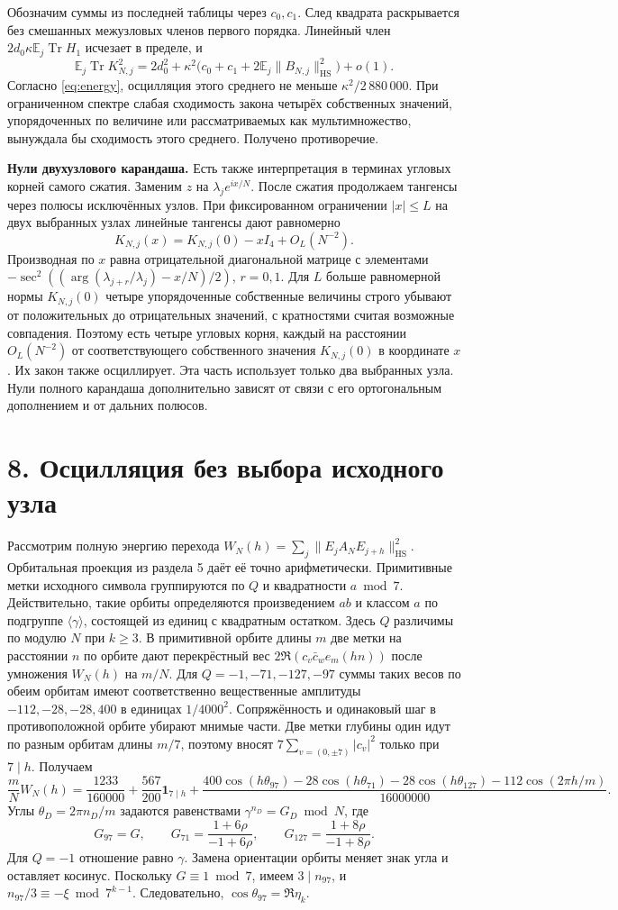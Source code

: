 \documentclass[11pt,a4paper]{article}
\newcommand{\Tr}{\operatorname{Tr}}
\newcommand{\EE}{\mathbb E}
\newcommand{\sect}[1]{\section*{\sffamily\color{ink}#1}}
\newcommand{\subt}[1]{\par\medskip\noindent\textbf{#1.}\quad}
\newcommand{\HS}{\mathrm{HS}}
\begin{document}
Обозначим суммы из последней таблицы через \(c_0,c_1\). След квадрата раскрывается без смешанных межузловых членов первого порядка. Линейный член \(2d_0\kappa\EE_j\Tr H_1\) исчезает в пределе, и
\[
  \EE_j\Tr K_{N,j}^2=
  2d_0^2+\kappa^2\bigl(c_0+c_1+2\EE_j\|B_{N,j}\|_{\HS}^2\bigr)+o(1).
\]
Согласно \eqref{eq:energy}, осцилляция этого среднего не меньше \(\kappa^2/2\,880\,000\). При ограниченном спектре слабая сходимость закона четырёх собственных значений, упорядоченных по величине или рассматриваемых как мультимножество, вынуждала бы сходимость этого среднего. Получено противоречие.

\subt{Нули двухузлового карандаша}
Есть также интерпретация в терминах угловых корней самого сжатия. Заменим \(z\) на \(\lambda_j e^{ix/N}\). После сжатия продолжаем тангенсы через полюсы исключённых узлов. При фиксированном ограничении \(|x|\le L\) на двух выбранных узлах линейные тангенсы дают равномерно
\[
       K_{N,j}(x)=K_{N,j}(0)-xI_4+O_L(N^{-2}).
\]
Производная по \(x\) равна отрицательной диагональной матрице с элементами \(-\sec^2((\arg(\lambda_{j+r}/\lambda_j)-x/N)/2)\), \(r=0,1\). Для \(L\) больше равномерной нормы \(K_{N,j}(0)\) четыре упорядоченные собственные величины строго убывают от положительных до отрицательных значений, с кратностями считая возможные совпадения. Поэтому есть четыре угловых корня, каждый на расстоянии \(O_L(N^{-2})\) от соответствующего собственного значения \(K_{N,j}(0)\) в координате \(x\). Их закон также осциллирует. Эта часть использует только два выбранных узла. Нули полного карандаша дополнительно зависят от связи с его ортогональным дополнением и от дальних полюсов.

\newpage
\sect{8. Осцилляция без выбора исходного узла}
Рассмотрим полную энергию перехода \(W_N(h)=\sum_j\|E_jA_NE_{j+h}\|_{\HS}^2\). Орбитальная проекция из раздела 5 даёт её точно арифметически. Примитивные метки исходного символа группируются по \(Q\) и квадратности \(a\bmod7\). Действительно, такие орбиты определяются произведением \(ab\) и классом \(a\) по подгруппе \(\langle\gamma\rangle\), состоящей из единиц с квадратным остатком. Здесь \(Q\) различимы по модулю \(N\) при \(k\ge3\). В примитивной орбите длины \(m\) две метки на расстоянии \(n\) по орбите дают перекрёстный вес \(2\Re(c_v\bar c_w e_m(hn))\) после умножения \(W_N(h)\) на \(m/N\). Для \(Q=-1,-71,-127,-97\) суммы таких весов по обеим орбитам имеют соответственно вещественные амплитуды \(-112,-28,-28,400\) в единицах \(1/4000^2\). Сопряжённость и одинаковый шаг в противоположной орбите убирают мнимые части. Две метки глубины один идут по разным орбитам длины \(m/7\), поэтому вносят \(7\sum_{v=(0,\pm7)}|c_v|^2\) только при \(7\mid h\). Получаем
\[
 \frac mN W_N(h)=\frac{1233}{160000}+\frac{567}{200}\mathbf1_{7\mid h}
 +\frac{400\cos(h\theta_{97})-28\cos(h\theta_{71})
 -28\cos(h\theta_{127})-112\cos(2\pi h/m)}{16000000}.
\]
Углы \(\theta_D=2\pi n_D/m\) задаются равенствами \(\gamma^{n_D}=G_D\bmod N\), где
\[
     G_{97}=G,\qquad G_{71}=\frac{1+6\rho}{-1+6\rho},
     \qquad G_{127}=\frac{1+8\rho}{-1+8\rho}.
\]
Для \(Q=-1\) отношение равно \(\gamma\). Замена ориентации орбиты меняет знак угла и оставляет косинус. Поскольку \(G\equiv1\bmod7\), имеем \(3\mid n_{97}\), и \(n_{97}/3\equiv-\xi\bmod7^{k-1}\). Следовательно, \(\cos\theta_{97}=\Re\eta_k\).
\end{document}
